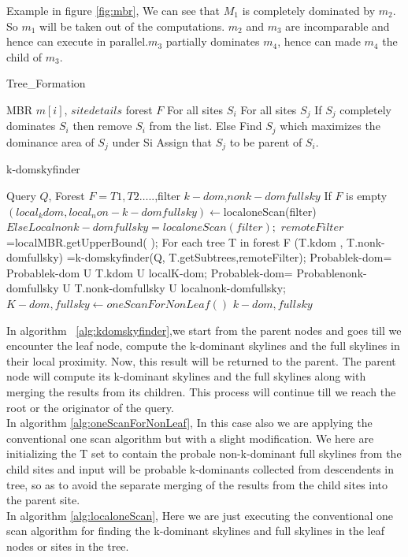 \documentclass[twocolumn]{article}
\begin{document}
 Example in figure \ref{fig:mbr}, We can see that \(M_1\) is completely dominated by \(m_2\). So \(m_1\) will be taken out of the computations. \(m_2\) and \(m_3\) are incomparable and hence can execute in parallel.\(m_3\) partially dominates \(m_4\), hence can made \(m_4\) the child of \(m_3\).

\begin{algorithm}
	\caption{Tree\_Formation}
	\label{alg:Tree_Formation}
	\begin{algorithmic}[1]
		\Require MBR $m[i]$, $sitedetails$
		\Ensure forest $F$
		\State For all sites \(S_i\)
		\State For all sites \(S_j\)
		\State If \(S_j\) completely dominates \(S_i\) then remove \(S_i\) from the list.
		\State Else
		\State Find \(S_j\) which maximizes the dominance area of \(S_j\) under Si
		\State Assign that \(S_j\) to be parent of \(S_i\).
		\end{algorithmic}
\end{algorithm}

\begin{algorithm}
	\caption{k-domskyfinder}
	\label{alg:kdomskyfinder}
	\begin{algorithmic}[1]
		\Require Query $Q$, Forest $F={ T1,T2…..}$,filter 
		\Ensure$k-dom$,$nonk-domfullsky$
		\State If  $F$ is empty
		\State $(local_kdom,local_non-k-domfullsky)$\(\gets\)localoneScan(filter)
		\State $Else Localnonk-domfullsky= localoneScan (filter);$
		\State $remoteFilter$ =localMBR.getUpperBound( );
		\State For each tree T in forest F 
		\State (T.kdom , T.nonk-domfullsky) =k-domskyfinder(Q, T.getSubtrees,remoteFilter);
		\State Probablek-dom= Probablek-dom U T.kdom U localK-dom;
		\State Probablek-dom= Probablenonk-domfullsky U T.nonk-domfullsky U localnonk-domfullsky;
		\State $K-dom,fullsky\gets oneScanForNonLeaf( )$
	    \State \Return $k-dom,fullsky$
	\end{algorithmic}
\end{algorithm}

In algorithm ~\ref{alg:kdomskyfinder},we start from the parent nodes and goes till we encounter the leaf node, compute the k-dominant skylines and the full skylines in their local proximity. Now, this result will be returned to the parent. The parent node will compute its k-dominant skylines and the full skylines along with merging the results from its children. This process will continue till we reach the root or the originator of the query.
 \\
 In algorithm \ref{alg:oneScanForNonLeaf}, \cite{Chan:2006:FKS:1142473.1142530} In this case also we are applying the conventional one scan algorithm but with a slight modification. We here are initializing the T set to contain the probale non-k-dominant full skylines from the child sites and input will be probable k-dominants collected from descendents in tree, so as to avoid the separate merging of the results from the child sites into the parent site.
 \\
In algorithm \ref{alg:localoneScan},\cite{Chan:2006:FKS:1142473.1142530} Here we are just executing the conventional one scan algorithm for finding the k-dominant skylines and full skylines in the leaf nodes or sites in the tree.
\end{document}
